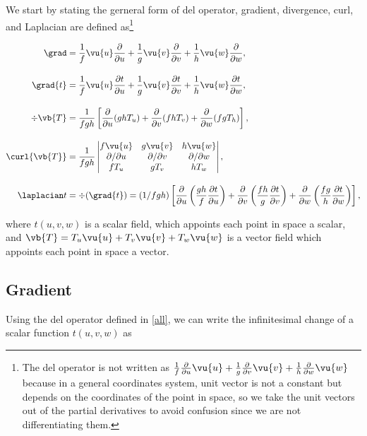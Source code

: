 \documentclass[english,a4paper,12pt]{report}
\begin{document}
We start by stating the gerneral form of del operator, gradient, divergence, curl, and Laplacian are defined as\footnote{The del operator is not written as \(\frac{1}{f} \frac{\partial}{\partial u}\vu{u}  + \frac{1}{g} \frac{\partial}{\partial v}\vu{v} + \frac{1}{h} \frac{\partial}{\partial w}\vu{w}\) because in a general coordinates system, unit vector is not a constant but depends on the coordinates of the point in space, so we take the unit vectors out of the partial derivatives to avoid confusion since we are not differentiating them.}

\begin{equation} \label{all} 
\begin{aligned}
\grad &= \frac{1}{f}\vu{u}\frac{\partial}{\partial u} + \frac{1}{g}\vu{v}\frac{\partial}{\partial v} + \frac{1}{h}\vu{w}\frac{\partial}{\partial w}, \\[10pt]
\grad{t }&= \frac{1}{f} \vu{u} \frac{\partial t}{\partial u} 
+ \frac{1}{g} \vu{v}\frac{\partial t}{\partial v}  
+ \frac{1}{h} \vu{w}\frac{\partial t}{\partial w} , \\[10pt]
\div{\vb{T}}  &= \frac{1}{fgh} \left[ 
\frac{\partial}{\partial u} (ghT_{u} ) + 
\frac{\partial}{\partial v} (fhT_{v} )+ 
\frac{\partial}{\partial w} (fgT_{h} ) \right], \\[10pt]
\curl{\vb{T} }  &= \frac{1}{fgh} 
\begin{vmatrix} 
f \vu{u} & g \vu{v} & h \vu{w} \\ 
\partial /\partial u & \partial /\partial v & \partial /\partial w \\ 
fT_{u}  & g T_{v}  & h T_{w}  
\end{vmatrix}, \\[10pt]
\laplacian t &= \div{(\grad{t} )} =  (1 / fgh) \left[
\frac{\partial}{\partial u} \left( \frac{gh}{f} \frac{\partial t}{\partial u} \right) + 
\frac{\partial}{\partial v} \left( \frac{fh}{g} \frac{\partial t}{\partial v} \right) + 
\frac{\partial}{\partial w} \left( \frac{fg}{h} \frac{\partial t}{\partial w} \right)
\right],
\end{aligned}
\end{equation}

where \(t (u,v,w)\) is a scalar field, which appoints each point in space a scalar, and \(\vb{T} = T_{u}\vu{u} + T_{v}\vu{v} + T_{w}\vu{w} \) is a vector field which appoints each point in space a vector.  

\subsection{Gradient}
Using the del operator defined in \cref{all}, we can write the infinitesimal change of a scalar function \(t(u,v,w)\) as
\end{document}
